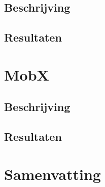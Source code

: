 \subsection{Beschrijving}
\subsection{Resultaten}

\section{MobX}
\subsection{Beschrijving}
\subsection{Resultaten}

\section{Samenvatting}
